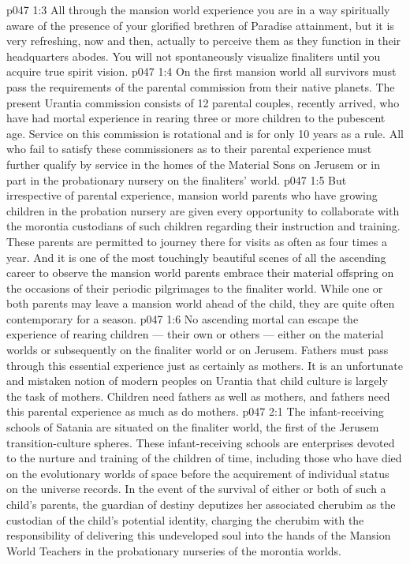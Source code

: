 \vs p047 1:3 All through the mansion world experience you are in a way spiritually aware of the presence of your glorified brethren of Paradise attainment, but it is very refreshing, now and then, actually to perceive them as they function in their headquarters abodes. You will not spontaneously visualize finaliters until you acquire true spirit vision.
\vs p047 1:4 \pc On the first mansion world all survivors must pass the requirements of the parental commission from their native planets. The present Urantia commission consists of 12 parental couples, recently arrived, who have had mortal experience in rearing three or more children to the pubescent age. Service on this commission is rotational and is for only 10 years as a rule. All who fail to satisfy these commissioners as to their parental experience must further qualify by service in the homes of the Material Sons on Jerusem or in part in the probationary nursery on the finaliters’ world.
\vs p047 1:5 But irrespective of parental experience, mansion world parents who have growing children in the probation nursery are given every opportunity to collaborate with the morontia custodians of such children regarding their instruction and training. These parents are permitted to journey there for visits as often as four times a year. And it is one of the most touchingly beautiful scenes of all the ascending career to observe the mansion world parents embrace their material offspring on the occasions of their periodic pilgrimages to the finaliter world. While one or both parents may leave a mansion world ahead of the child, they are quite often contemporary for a season.
\vs p047 1:6 No ascending mortal can escape the experience of rearing children --- their own or others --- either on the material worlds or subsequently on the finaliter world or on Jerusem. Fathers must pass through this essential experience just as certainly as mothers. It is an unfortunate and mistaken notion of modern peoples on Urantia that child culture is largely the task of mothers. Children need fathers as well as mothers, and fathers need this parental experience as much as do mothers.
\vs p047 2:1 The infant\hyp{}receiving schools of Satania are situated on the finaliter world, the first of the Jerusem transition\hyp{}culture spheres. These infant\hyp{}receiving schools are enterprises devoted to the nurture and training of the children of time, including those who have died on the evolutionary worlds of space before the acquirement of individual status on the universe records. In the event of the survival of either or both of such a child’s parents, the guardian of destiny deputizes her associated cherubim as the custodian of the child’s potential identity, charging the cherubim with the responsibility of delivering this undeveloped soul into the hands of the Mansion World Teachers in the probationary nurseries of the morontia worlds.
